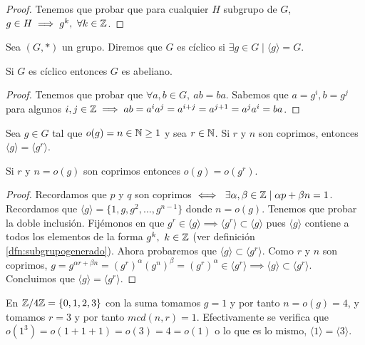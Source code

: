 \begin{proof}
	Tenemos que probar que para cualquier $H$ subgrupo de $G$, $g \in H \implies g^k,\ \forall k \in \mathbb{Z}$.
\end{proof}

\begin{dfn}
	Sea $(G, \ast)$ un grupo. Diremos que $G$ es cíclico si $\exists g \in G \mid \langle g \rangle = G$.
\end{dfn}

\begin{thm}
	\label{thm:ciclicoimplicaabeliano}
	Si $G$ es cíclico entonces $G$ es abeliano.
\end{thm}

\begin{proof}
	Tenemos que probar que $\forall a,b \in G,\ ab = ba$. Sabemos que $a = g^i, b = g^j$ para algunos $i, j \in \mathbb{Z} \implies ab = a^i a^j = a^{i+j} = a^{j+1} = a^j a^i = ba$.
\end{proof}


\begin{thm}
	\label{thm:coprimosgeneradosiguales}
	Sea $g \in G$ tal que $o(g) = n \in \mathbb{N} \geq 1$ y sea $r \in \mathbb{N}$. Si $r$ y $n$ son coprimos, entonces $\langle g \rangle = \langle g^r \rangle$.
\end{thm}

\begin{cor}
	Si $r$ y $n = o(g)$ son coprimos entonces $o(g) = o(g^r)$.
\end{cor}

\begin{proof}
	Recordamos que $p$ y $q$ son coprimos $\iff\ \exists \alpha, \beta \in \mathbb{Z} \mid \alpha p + \beta n = 1$. Recordamos que $\langle g \rangle = \{1, g, g^2, \dots, g^{n-1}\}$ donde $n = o(g)$. Tenemos que probar la doble inclusión. Fijémonos en que $g^r \in \langle g \rangle \implies \langle g^r\rangle \subset \langle g \rangle$ pues $\langle g \rangle$ contiene a todos los elementos de la forma $g^k,\ k \in \mathbb{Z}$ (ver definición \ref{dfn:subgrupogenerado}). Ahora probaremos que $\langle g \rangle \subset \langle g^r \rangle$. Como $r$ y $n$ son coprimos, $g = g^{\alpha r + \beta n} = (g^r)^\alpha (g^n)^\beta = (g^r)^\alpha \in \langle g^r \rangle \implies \langle g \rangle \subset \langle g^r \rangle$. Concluimos que $\langle g \rangle = \langle g^r \rangle$.
\end{proof}

\begin{ej}
	En $\mathbb{Z}/4\mathbb{Z} = \{0, 1, 2, 3\}$ con la suma tomamos $g = 1$ y por tanto $n = o(g) = 4$, y tomamos $r = 3$ y por tanto $mcd(n, r) = 1$. Efectivamente se verifica que $o(1^3) = o(1+1+1) = o(3) = 4 = o(1)$ o lo que es lo mismo, $\langle 1 \rangle = \langle 3 \rangle$.
\end{ej}

